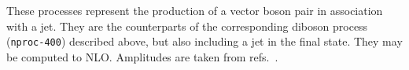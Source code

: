 \label{subsec:dibosonjet}

These processes represent the production of a vector boson pair in association
with a jet.  They are the counterparts of the corresponding diboson process
(\texttt{nproc-400}) described above, but also including a jet in the final
state.  They may be computed to NLO.
Amplitudes are taken from refs.~\cite{Campbell:2015hya,Campbell:2016uvh,Campbell:2022qpq}.
